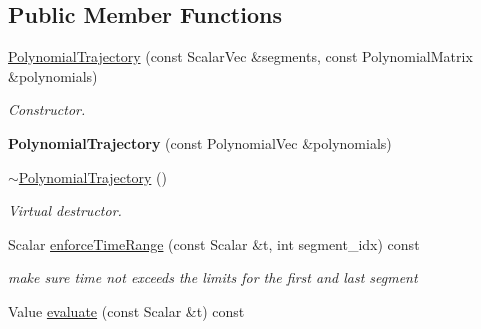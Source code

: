 \subsection*{Public Member Functions}
\begin{DoxyCompactItemize}
\item 
\hyperlink{classow__core_1_1PolynomialTrajectory_a9b81919d4f0463897861835e3f5b342c}{Polynomial\+Trajectory} (const Scalar\+Vec \&segments, const Polynomial\+Matrix \&polynomials)
\begin{DoxyCompactList}\small\item\em Constructor. \end{DoxyCompactList}\item 
{\bfseries Polynomial\+Trajectory} (const Polynomial\+Vec \&polynomials)\hypertarget{classow__core_1_1PolynomialTrajectory_afbf3300267f069481e64c0a78639e048}{}\label{classow__core_1_1PolynomialTrajectory_afbf3300267f069481e64c0a78639e048}

\item 
\hyperlink{classow__core_1_1PolynomialTrajectory_aa7cfb26d8d5c654df8d1c8b34aa8d755}{$\sim$\+Polynomial\+Trajectory} ()\hypertarget{classow__core_1_1PolynomialTrajectory_aa7cfb26d8d5c654df8d1c8b34aa8d755}{}\label{classow__core_1_1PolynomialTrajectory_aa7cfb26d8d5c654df8d1c8b34aa8d755}

\begin{DoxyCompactList}\small\item\em Virtual destructor. \end{DoxyCompactList}\item 
Scalar \hyperlink{classow__core_1_1PolynomialTrajectory_ad8e52b08c03601bc7756a03030e32092}{enforce\+Time\+Range} (const Scalar \&t, int segment\+\_\+idx) const \hypertarget{classow__core_1_1PolynomialTrajectory_ad8e52b08c03601bc7756a03030e32092}{}\label{classow__core_1_1PolynomialTrajectory_ad8e52b08c03601bc7756a03030e32092}

\begin{DoxyCompactList}\small\item\em make sure time not exceeds the limits for the first and last segment \end{DoxyCompactList}\item 
Value \hyperlink{classow__core_1_1PolynomialTrajectory_a9cdd7a52a8a0edc84c354d95ebd97194}{evaluate} (const Scalar \&t) const \hypertarget{classow__core_1_1PolynomialTrajectory_a9cdd7a52a8a0edc84c354d95ebd97194}{}\label{classow__core_1_1PolynomialTrajectory_a9cdd7a52a8a0edc84c354d95ebd97194}


\end{DoxyCompactItemize}
